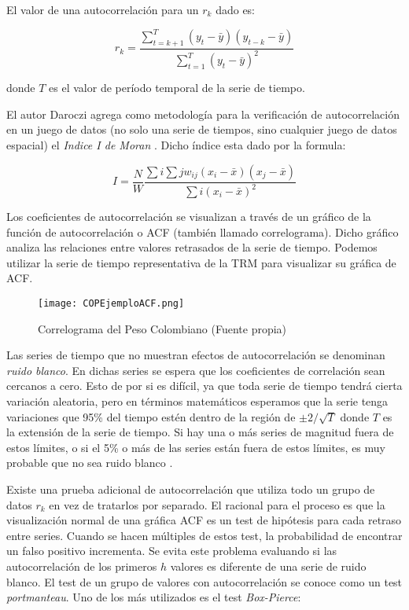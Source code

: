 El valor de una autocorrelación para un \(r_{k}\) dado es:

\[ r_{k} = \frac{\sum_{t = k + 1}^T(y_{t} - \bar{y})(y_{t - k} - \bar{y})}{\sum_{t = 1}^T(y_{t} - \bar{y})^{2}} \]

donde \(T\) es el valor de período temporal de la serie de tiempo.

El autor Daroczi agrega como metodología para la verificación de autocorrelación en un juego de datos (no solo una serie de tiempos, sino cualquier juego de datos espacial) el \emph{Indice I de Moran} \cite{daroczi}. Dicho índice esta dado por la formula:

\[ I = \frac{N}{W}
	\frac{\sum{i}\sum{j}w_{ij}(x_{i} - \bar{x})(x_{j} - \bar{x})}{{\sum{i}(x_{i} - \bar{x})^2}} \]

Los coeficientes de autocorrelación se visualizan a través de un gráfico de la función de autocorrelación o ACF (también llamado correlograma). Dicho gráfico analiza las relaciones entre valores retrasados de la serie de tiempo. Podemos utilizar la serie de tiempo representativa de la TRM para visualizar su gráfica de ACF.

\begin{figure}[h!]
    \centering
    \texttt{[image: COPEjemploACF.png]}
    \caption{Correlograma del Peso Colombiano (Fuente propia)}
\end{figure}

Las series de tiempo que no muestran efectos de autocorrelación se denominan \emph{ruido blanco}. En dichas series se espera que los coeficientes de correlación sean cercanos a cero. Esto de por si es difícil, ya que toda serie de tiempo tendrá cierta variación aleatoria, pero en términos matemáticos esperamos que la serie tenga variaciones que 95\% del tiempo estén dentro de la región de $\pm2/\sqrt{T}$ donde $T$ es la extensión de la serie de tiempo. Si hay una o más series de magnitud fuera de estos límites, o si el 5\% o más de las series están fuera de estos límites, es muy probable que no sea ruido blanco \cite{hyndman}.

Existe una prueba adicional de autocorrelación que utiliza todo un grupo de datos $r_k$ en vez de tratarlos por separado. El racional para el proceso es que la visualización normal de una gráfica ACF es un test de hipótesis para cada retraso entre series. Cuando se hacen múltiples de estos test, la probabilidad de encontrar un falso positivo incrementa. Se evita este problema evaluando si las autocorrelación de los primeros $h$ valores es diferente de una serie de ruido blanco. El test de un grupo de valores con autocorrelación se conoce como un test \emph{portmanteau}. Uno de los más utilizados es el test \emph{Box-Pierce}:

